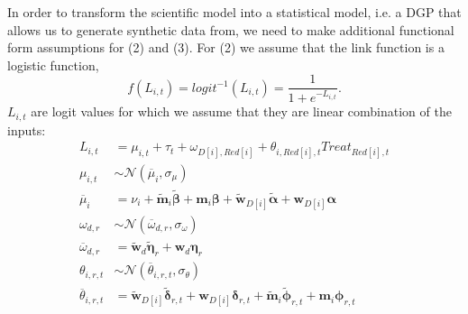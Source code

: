 \documentclass{article}
\begin{document}
In order to transform the scientific model into a statistical model, i.e. a 
DGP that allows us to generate synthetic data from, we need to
make additional functional form assumptions for (2) and (3). For (2) we 
assume that the link function is a logistic function, 
\begin{equation}  
    f(L_{i,t})= logit^{-1}(L_{i,t}) = \frac{1}{1 + e^{-L_{i,t}}}. 
\end{equation}
$L_{i,t}$ are logit values for which we assume that they are linear combination 
of the inputs: 
\begin{equation}
\begin{aligned}      
    L_{i,t} &= \mu_{i,t} + \tau_t + \omega_{D[i],Red[i]} + \theta_{i,Red[i],t} Treat_{Red[i],t} \\
    \mu_{i,t} &\sim \mathcal{N}(\overline{\mu}_{i},\sigma_{\mu}) \\
    \overline{\mu}_{i} &= \nu_i + \tilde{\mathbf{m}}_i \tilde{\boldsymbol{\beta}} +  \mathbf{m}_i \boldsymbol{\beta}  + \tilde{\mathbf{w}}_{D[i]} \tilde{\boldsymbol{\alpha}} + \mathbf{w}_{D[i]} \boldsymbol{\alpha}\\
    \omega_{d,r} &\sim \mathcal{N}(\overline{\omega}_{d,r},\sigma_{\omega}) \\
    \overline{\omega}_{d,r} &= \tilde{\mathbf{w}}_d \tilde{\boldsymbol{\eta}}_r + \mathbf{w}_d \boldsymbol{\eta}_r \\
    \theta_{i,r,t} &\sim \mathcal{N}(\overline{\theta}_{i,r,t},\sigma_{\theta}) \\
    \overline{\theta}_{i,r,t} &= \tilde{\mathbf{w}}_{D[i]} \tilde{\boldsymbol{\delta}}_{r,t} + \mathbf{w}_{D[i]} \boldsymbol{\delta}_{r,t} +\tilde{\mathbf{m}}_i \tilde{\boldsymbol{\phi}}_{r,t} + \mathbf{m}_i \boldsymbol{\phi}_{r,t}
\end{aligned}
\end{equation}
\end{document}
